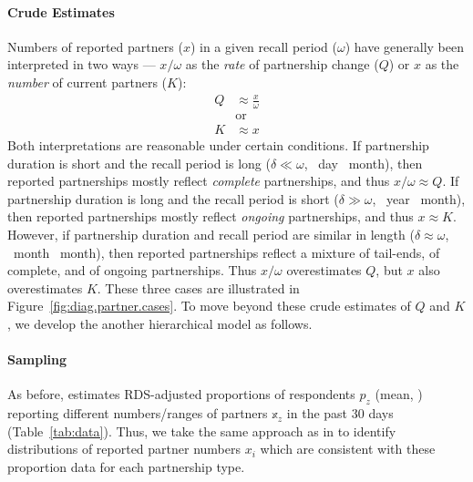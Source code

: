 \paragraph{Crude Estimates}
Numbers of reported partners ($x$) in a given recall period ($\omega$)
have generally been interpreted in two ways ---
$x/\omega$ as the \emph{rate} of partnership change ($Q$) or
$x$ as the \emph{number} of current partners ($K$):
\begin{subequations}\label{eq:bQK}
\begin{alignat}{1}
  Q &\approx \frac{x}{\omega} \label{eq:bQ}\\
    &\text{or} \nonumber\\
  K &\approx x \label{eq:bK}
\end{alignat}
\end{subequations}
Both interpretations are reasonable under certain conditions.
If partnership duration is short and the recall period is long
($\delta \ll \omega$, ~day ~month),
then reported partnerships mostly reflect \emph{complete} partnerships,
and thus $x/\omega \approx Q$.
If partnership duration is long and the recall period is short
($\delta \gg \omega$, ~year ~month),
then reported partnerships mostly reflect \emph{ongoing} partnerships,
and thus $x \approx K$.
However, if partnership duration and recall period are similar in length
($\delta \approx \omega$, ~month ~month),
then reported partnerships reflect a mixture of tail-ends, of complete, and of ongoing partnerships.
Thus $x/\omega$ overestimates $Q$, but $x$ also overestimates $K$.
These three cases are illustrated in Figure~\ref{fig:diag.partner.cases}.
To move beyond these crude estimates of $Q$ and $K$,
we develop the another hierarchical model as follows.
\paragraph{Sampling}
As before, \cite{Baral2014} estimates RDS-adjusted proportions of respondents $p_z$ (mean, \ci)
reporting different numbers/ranges of partners $\mathbb{x}_z$ in the past 30 days
(Table~\ref{tab:data}).
Thus, we take the same approach as in 
to identify distributions of reported partner numbers $x_i$
which are consistent with these proportion data for each partnership type.
